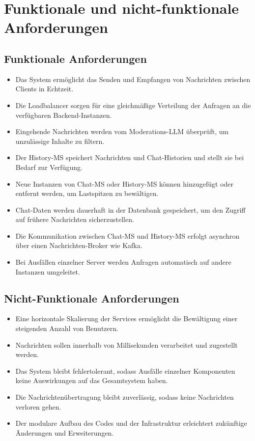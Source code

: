 \documentclass[12pt]{report}
\begin{document}
\section{Funktionale und nicht-funktionale Anforderungen}

\subsection{Funktionale Anforderungen}
\begin{itemize}
	\item Das System ermöglicht das Senden und Empfangen von Nachrichten zwischen Clients in Echtzeit.
	\item Die Loadbalancer sorgen für eine gleichmäßige Verteilung der Anfragen an die verfügbaren Backend-Instanzen.
	\item Eingehende Nachrichten werden vom Moderations-LLM überprüft, um unzulässige Inhalte zu filtern.
	\item Der History-MS speichert Nachrichten und Chat-Historien und stellt sie bei Bedarf zur Verfügung.
	\item Neue Instanzen von Chat-MS oder History-MS können hinzugefügt oder entfernt werden, um Lastspitzen zu bewältigen.
	\item Chat-Daten werden dauerhaft in der Datenbank gespeichert, um den Zugriff auf frühere Nachrichten sicherzustellen.
	\item Die Kommunikation zwischen Chat-MS und History-MS erfolgt asynchron über einen Nachrichten-Broker wie Kafka.
	\item Bei Ausfällen einzelner Server werden Anfragen automatisch auf andere Instanzen umgeleitet.
\end{itemize}

\subsection{Nicht-Funktionale Anforderungen}
\begin{itemize}
	\item Eine horizontale Skalierung der Services ermöglicht die Bewältigung einer steigenden Anzahl von Benutzern.
	\item Nachrichten sollen innerhalb von Millisekunden verarbeitet und zugestellt werden.
	\item Das System bleibt fehlertolerant, sodass Ausfälle einzelner Komponenten keine Auswirkungen auf das Gesamtsystem haben.
	\item Die Nachrichtenübertragung bleibt zuverlässig, sodass keine Nachrichten verloren gehen.
	\item Der modulare Aufbau des Codes und der Infrastruktur erleichtert zukünftige Änderungen und Erweiterungen.
\end{itemize}
\end{document}
